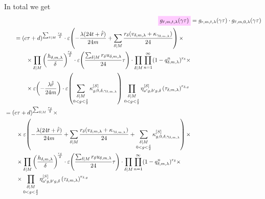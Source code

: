 \documentclass{article}
\begin{document}
In total we get
\begin{align}
  \defineNotation[g-rbar-m-r-lambda]{g_{\bar{r},m,t,\lambda}(\gamma\tau)}
  &=
  g_{r,m,t,\lambda}(\gamma\tau) \cdot g_{\tilde{r},m,0,\lambda}(\gamma\tau)
  \notag\\
  \begin{split}
  &=
    (c\tau+d)^{\divisorsum{M} \frac{r_\delta}{2}} \cdot
    \unityPower{-\frac{\lambda (24t+\sumdelta{\bar{r}})}{24m}
    + \divisorsum{M}\frac{r_\delta(v_{\delta,m,\lambda} +
    \kappa_{\gamma_{\delta,m,\lambda}})}{24}} \times\\
  & \qquad\times
    \divisorprod{M}
    \left(\frac{h_{\delta,m,\lambda}}{\delta}\right)^{\!\frac{r_\delta}{2}}
    \cdot
    \unityPower{\frac{\divisorsum{M} r_\delta u_{\delta,m,\lambda}}{24} \tau}
    \cdot
    \divisorprod{M}
    \prod_{n=1}^\infty (1-q_{\delta,m,\lambda}^n)^{r_\delta}
     \times\\
  & \qquad\times
    \unityPower{-\frac{\lambda \sumdelta{\tilde{r}}}{24m}}
    \cdot
    \unityPower{
      \sum_{\substack{\divides{\delta}{M}\\0 < g < \frac{\delta}{2}}}
      \kappa_{g,0,\delta,\gamma_{\delta,m,\lambda}}^{[S]}} \,
    \prod_{\substack{\divides{\delta}{M}\\0 < g < \frac{\delta}{2}}}
    \eta_{a'g,b'g,\delta}^{[S]}
    \left(
      \tau_{\delta,m,\lambda}
    \right)^{r_{\delta,g}}
  \end{split}
  \notag\\
  \begin{split}
  &=
    (c\tau+d)^{\divisorsum{M} \frac{r_\delta}{2}} \times\\
  & \qquad\times
    \unityPower{-\frac{\lambda (24t+\sumdelta{\bar{r}})}{24m}
      +
      \divisorsum{M}\frac{r_\delta(v_{\delta,m,\lambda} +
        \kappa_{\gamma_{\delta,m,\lambda}})}{24}
      +
      \sum_{\substack{\divides{\delta}{M}\\0 < g < \frac{\delta}{2}}}
      \kappa_{g,0,\delta,\gamma_{\delta,m,\lambda}}^{[S]}} \times\\
  & \qquad\times
    \divisorprod{M}
    \left(\frac{h_{\delta,m,\lambda}}{\delta}\right)^{\!\frac{r_\delta}{2}}
    \cdot
    \unityPower{\frac{\divisorsum{M} r_\delta u_{\delta,m,\lambda}}{24} \tau}
    \cdot
    \divisorprod{M}
    \prod_{n=1}^\infty (1-q_{\delta,m,\lambda}^n)^{r_\delta}
     \times\\
  & \qquad\times
    \prod_{\substack{\divides{\delta}{M}\\0 < g < \frac{\delta}{2}}}
    \eta_{a'g,b'g,\delta}^{[S]}
    \left(
      \tau_{\delta,m,\lambda}
    \right)^{r_{\delta,g}}
  \end{split}
  \label{eq:g_rbar-m-t-lambda(gamma*tau)}
\end{align}
\end{document}
